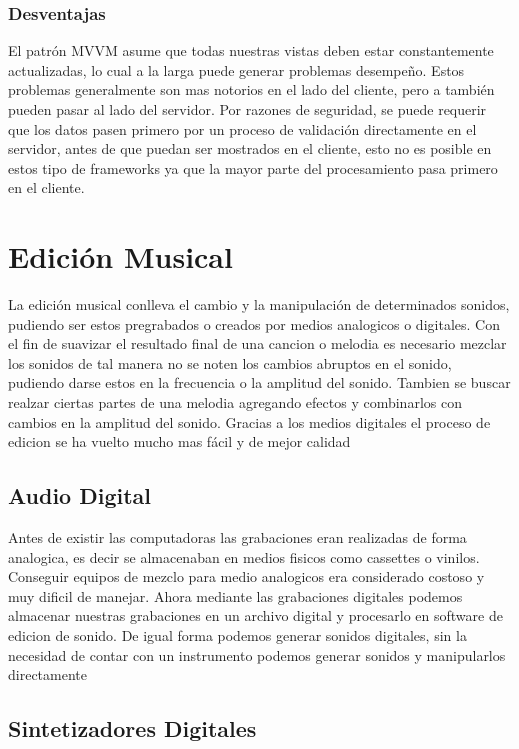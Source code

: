 \subsubsection{Desventajas}
El patrón MVVM asume que todas nuestras vistas deben estar constantemente
actualizadas, lo cual a la larga puede generar problemas desempeño. Estos
problemas generalmente son mas notorios en el lado del cliente, pero a también
pueden pasar al lado del servidor.
Por razones de seguridad, se puede requerir que los datos
pasen primero por un proceso de validación directamente en el servidor,
antes de que puedan ser mostrados en el cliente, esto no es posible en
estos tipo de frameworks ya que la mayor parte del procesamiento pasa
primero en el cliente.

\section{Edición Musical}

La edición musical conlleva el cambio y la manipulación de determinados
sonidos, pudiendo ser estos pregrabados o creados por medios analogicos
o digitales. Con el fin de suavizar el resultado final de una cancion o
melodia es necesario mezclar los sonidos de tal manera no se noten los
cambios abruptos en el sonido, pudiendo darse estos en la frecuencia o
la amplitud del sonido. Tambien se buscar realzar ciertas partes de una
melodia agregando efectos y combinarlos con cambios en la amplitud del sonido.
Gracias a los medios digitales el proceso de edicion se ha vuelto mucho
mas fácil y de mejor calidad

\subsection{Audio Digital}

Antes de existir las computadoras las grabaciones eran realizadas de
forma analogica, es decir se almacenaban en medios fisicos como cassettes
o vinilos.
Conseguir equipos de mezclo para medio analogicos era considerado costoso
y muy dificil de manejar. Ahora mediante las grabaciones digitales podemos
almacenar nuestras grabaciones en un archivo digital y procesarlo en
software de edicion de sonido. De igual forma podemos generar sonidos
digitales, sin la necesidad de contar con un instrumento podemos generar
sonidos y manipularlos directamente

\subsection{Sintetizadores Digitales}

